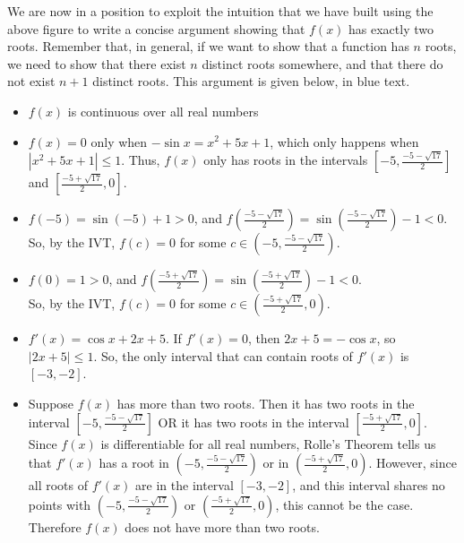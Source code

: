\begin{solution}
         We are now in a position
         to exploit the intuition that we have built using the above
         figure to write a concise argument showing that $f(x)$ has exactly
         two roots.
         Remember that, in general, if we want to show that a function has $n$ roots, we need to show that there exist $n$ distinct roots somewhere, and that there do not exist $n+1$ distinct roots. This argument is given below, in blue text.
\color{blue}
\begin{itemize}
\item $f(x)$ is continuous over all real numbers
\item $f(x)=0$ only when $-\sin x=x^2+5x+1$, which only happens when $|x^2+5x+1| \leq 1$. Thus, $f(x)$ only has roots in the intervals
$\left[-5,\frac{-5-\sqrt{17}}{2}\right]$ and $\left[\frac{-5+\sqrt{17}}{2},0\right]$.
\item  $f(-5)=\sin(-5)+1 > 0$, and $f\left(\frac{-5-\sqrt{17}}{2}\right)=\sin\left(\frac{-5-\sqrt{17}}{2}\right)-1 <0$.\\ So, by the IVT, $f(c)=0$ for some
$c \in \left(-5,\frac{-5-\sqrt{17}}{2}\right)$.
\item $f(0)=1>0$, and $f\left(\frac{-5+\sqrt{17}}{2}\right)=\sin\left(\frac{-5+\sqrt{17}}{2}\right)-1<0$.\\ So, by the IVT, $f(c)=0$ for some
$c \in \left(\frac{-5+\sqrt{17}}{2},0\right)$.
\item $f'(x)=\cos x + 2x + 5$. If $f'(x)=0$, then $2x+5=-\cos x$, so $|2x+5| \leq 1$. So, the only interval that can contain roots of $f'(x)$ is $[-3,-2]$.
\item Suppose $f(x)$ has more than two roots. Then it has two roots in the interval
$\left[-5,\frac{-5-\sqrt{17}}{2}\right]$ OR it has two roots in the interval
$\left[\frac{-5+\sqrt{17}}{2},0\right]$. Since $f(x)$ is differentiable for all real numbers,  Rolle's Theorem tells us that $f'(x)$ has a root in $\left(-5,\frac{-5-\sqrt{17}}{2}\right)$ or in $\left(\frac{-5+\sqrt{17}}{2},0\right)$. However, since all roots of $f'(x)$ are in the interval $[-3,-2]$, and this interval shares no points with $\left(-5,\frac{-5-\sqrt{17}}{2}\right)$ or $\left(\frac{-5+\sqrt{17}}{2},0\right)$, this cannot be the case. Therefore $f(x)$ does not have more than two roots.
\begin{center}
\end{center}
\end{itemize}
\end{solution}
